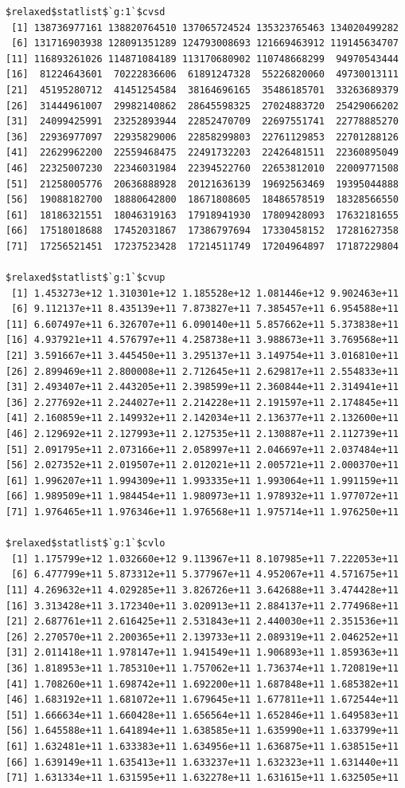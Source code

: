 \documentclass[
]{article}
\begin{document}
\begin{verbatim}
$relaxed$statlist$`g:1`$cvsd
 [1] 138736977161 138820764510 137065724524 135323765463 134020499282
 [6] 131716903938 128091351289 124793008693 121669463912 119145634707
[11] 116893261026 114871084189 113170680902 110748668299  94970543444
[16]  81224643601  70222836606  61891247328  55226820060  49730013111
[21]  45195280712  41451254584  38164696165  35486185701  33263689379
[26]  31444961007  29982140862  28645598325  27024883720  25429066202
[31]  24099425991  23252893944  22852470709  22697551741  22778885270
[36]  22936977097  22935829006  22858299803  22761129853  22701288126
[41]  22629962200  22559468475  22491732203  22426481511  22360895049
[46]  22325007230  22346031984  22394522760  22653812010  22009771508
[51]  21258005776  20636888928  20121636139  19692563469  19395044888
[56]  19088182700  18880642800  18671808605  18486578519  18328566550
[61]  18186321551  18046319163  17918941930  17809428093  17632181655
[66]  17518018688  17452031867  17386797694  17330458152  17281627358
[71]  17256521451  17237523428  17214511749  17204964897  17187229804

$relaxed$statlist$`g:1`$cvup
 [1] 1.453273e+12 1.310301e+12 1.185528e+12 1.081446e+12 9.902463e+11
 [6] 9.112137e+11 8.435139e+11 7.873827e+11 7.385457e+11 6.954588e+11
[11] 6.607497e+11 6.326707e+11 6.090140e+11 5.857662e+11 5.373838e+11
[16] 4.937921e+11 4.576797e+11 4.258738e+11 3.988673e+11 3.769568e+11
[21] 3.591667e+11 3.445450e+11 3.295137e+11 3.149754e+11 3.016810e+11
[26] 2.899469e+11 2.800008e+11 2.712645e+11 2.629817e+11 2.554833e+11
[31] 2.493407e+11 2.443205e+11 2.398599e+11 2.360844e+11 2.314941e+11
[36] 2.277692e+11 2.244027e+11 2.214228e+11 2.191597e+11 2.174845e+11
[41] 2.160859e+11 2.149932e+11 2.142034e+11 2.136377e+11 2.132600e+11
[46] 2.129692e+11 2.127993e+11 2.127535e+11 2.130887e+11 2.112739e+11
[51] 2.091795e+11 2.073166e+11 2.058997e+11 2.046697e+11 2.037484e+11
[56] 2.027352e+11 2.019507e+11 2.012021e+11 2.005721e+11 2.000370e+11
[61] 1.996207e+11 1.994309e+11 1.993335e+11 1.993064e+11 1.991159e+11
[66] 1.989509e+11 1.984454e+11 1.980973e+11 1.978932e+11 1.977072e+11
[71] 1.976465e+11 1.976346e+11 1.976568e+11 1.975714e+11 1.976250e+11

$relaxed$statlist$`g:1`$cvlo
 [1] 1.175799e+12 1.032660e+12 9.113967e+11 8.107985e+11 7.222053e+11
 [6] 6.477799e+11 5.873312e+11 5.377967e+11 4.952067e+11 4.571675e+11
[11] 4.269632e+11 4.029285e+11 3.826726e+11 3.642688e+11 3.474428e+11
[16] 3.313428e+11 3.172340e+11 3.020913e+11 2.884137e+11 2.774968e+11
[21] 2.687761e+11 2.616425e+11 2.531843e+11 2.440030e+11 2.351536e+11
[26] 2.270570e+11 2.200365e+11 2.139733e+11 2.089319e+11 2.046252e+11
[31] 2.011418e+11 1.978147e+11 1.941549e+11 1.906893e+11 1.859363e+11
[36] 1.818953e+11 1.785310e+11 1.757062e+11 1.736374e+11 1.720819e+11
[41] 1.708260e+11 1.698742e+11 1.692200e+11 1.687848e+11 1.685382e+11
[46] 1.683192e+11 1.681072e+11 1.679645e+11 1.677811e+11 1.672544e+11
[51] 1.666634e+11 1.660428e+11 1.656564e+11 1.652846e+11 1.649583e+11
[56] 1.645588e+11 1.641894e+11 1.638585e+11 1.635990e+11 1.633799e+11
[61] 1.632481e+11 1.633383e+11 1.634956e+11 1.636875e+11 1.638515e+11
[66] 1.639149e+11 1.635413e+11 1.633237e+11 1.632323e+11 1.631440e+11
[71] 1.631334e+11 1.631595e+11 1.632278e+11 1.631615e+11 1.632505e+11


\end{verbatim}
\end{document}
